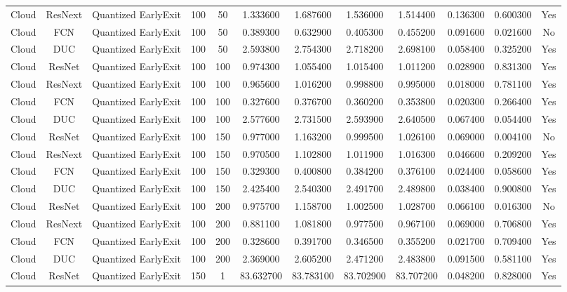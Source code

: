 \begin{tabular}{|c||c||c||c||c||c||c||c||c||c||c||c|}
Cloud & ResNext & Quantized EarlyExit & 100 & 50 & 1.333600 & 1.687600 & 1.536000 & 1.514400 & 0.136300 & 0.600300 & Yes \\
Cloud & FCN & Quantized EarlyExit & 100 & 50 & 0.389300 & 0.632900 & 0.405300 & 0.455200 & 0.091600 & 0.021600 & No \\
Cloud & DUC & Quantized EarlyExit & 100 & 50 & 2.593800 & 2.754300 & 2.718200 & 2.698100 & 0.058400 & 0.325200 & Yes \\
Cloud & ResNet & Quantized EarlyExit & 100 & 100 & 0.974300 & 1.055400 & 1.015400 & 1.011200 & 0.028900 & 0.831300 & Yes \\
Cloud & ResNext & Quantized EarlyExit & 100 & 100 & 0.965600 & 1.016200 & 0.998800 & 0.995000 & 0.018000 & 0.781100 & Yes \\
Cloud & FCN & Quantized EarlyExit & 100 & 100 & 0.327600 & 0.376700 & 0.360200 & 0.353800 & 0.020300 & 0.266400 & Yes \\
Cloud & DUC & Quantized EarlyExit & 100 & 100 & 2.577600 & 2.731500 & 2.593900 & 2.640500 & 0.067400 & 0.054400 & Yes \\
Cloud & ResNet & Quantized EarlyExit & 100 & 150 & 0.977000 & 1.163200 & 0.999500 & 1.026100 & 0.069000 & 0.004100 & No \\
Cloud & ResNext & Quantized EarlyExit & 100 & 150 & 0.970500 & 1.102800 & 1.011900 & 1.016300 & 0.046600 & 0.209200 & Yes \\
Cloud & FCN & Quantized EarlyExit & 100 & 150 & 0.329300 & 0.400800 & 0.384200 & 0.376100 & 0.024400 & 0.058600 & Yes \\
Cloud & DUC & Quantized EarlyExit & 100 & 150 & 2.425400 & 2.540300 & 2.491700 & 2.489800 & 0.038400 & 0.900800 & Yes \\
Cloud & ResNet & Quantized EarlyExit & 100 & 200 & 0.975700 & 1.158700 & 1.002500 & 1.028700 & 0.066100 & 0.016300 & No \\
Cloud & ResNext & Quantized EarlyExit & 100 & 200 & 0.881100 & 1.081800 & 0.977500 & 0.967100 & 0.069000 & 0.706800 & Yes \\
Cloud & FCN & Quantized EarlyExit & 100 & 200 & 0.328600 & 0.391700 & 0.346500 & 0.355200 & 0.021700 & 0.709400 & Yes \\
Cloud & DUC & Quantized EarlyExit & 100 & 200 & 2.369000 & 2.605200 & 2.471200 & 2.483800 & 0.091500 & 0.581100 & Yes \\
Cloud & ResNet & Quantized EarlyExit & 150 & 1 & 83.632700 & 83.783100 & 83.702900 & 83.707200 & 0.048200 & 0.828000 & Yes \\

\end{tabular}
